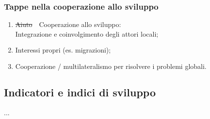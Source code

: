 \documentclass{article}
\begin{document}
\subsubsection{Tappe nella cooperazione allo sviluppo}
\begin{enumerate}
    \item \sout{Aiuto}\ \textrightarrow\ Cooperazione allo sviluppo:\\
        Integrazione e coinvolgimento degli attori locali;
    \item Interessi propri (es. migrazioni);
    \item Cooperazione / multilateralismo per risolvere i problemi globali.
\end{enumerate}

\subsection{Indicatori e indici di sviluppo}
...
\end{document}
